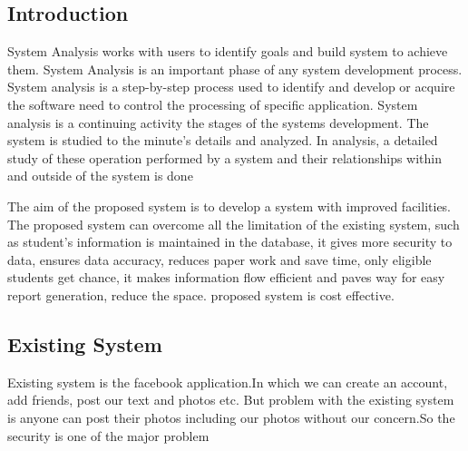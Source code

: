 \documentclass[a4paper,12pt]{article}
\begin{document}
\subsection{Introduction }
\hspace{5mm}
System Analysis works with users to identify goals and build system to achieve them. System Analysis is an important phase of any system development process.  System analysis is a step-by-step process used to identify and develop or acquire the software need to control the processing of specific application. System analysis is a continuing activity the stages of the systems development. The system is studied to the minute’s details and analyzed. In analysis, a detailed study of these operation performed by a system and their relationships within and outside of the system is done
\vspace{5mm}\newline\par
The aim of the proposed system is to develop a system with improved facilities. The proposed system can overcome all the limitation of the existing system, such as student’s information is maintained in the database, it gives more security to data, ensures data accuracy, reduces paper work and save time, only eligible students get chance, it makes information flow efficient and paves way for easy report generation, reduce the space. proposed system is cost effective.        

\newpage
\subsection{Existing System}
\hspace{5mm}
Existing system is the facebook application.In which we can create an account, add friends, post our text and photos etc. But problem with the existing system is anyone can post their photos including our photos without our concern.So the security is one of the major problem
\newpage
\end{document}
